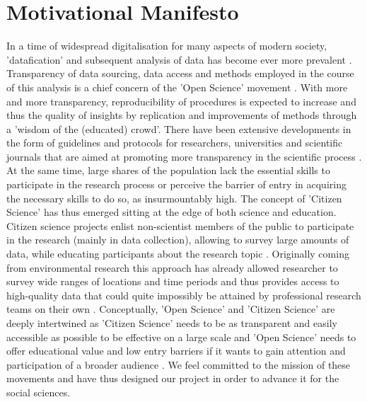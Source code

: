 \documentclass[preprint,12pt,authoryear]{elsarticle}
\begin{document}
	\section{Motivational Manifesto}
	In a time of widespread digitalisation for many aspects of modern society, 'datafication' and subsequent analysis of data has become ever more prevalent \citep{baack_datafication_2015, lycett_datafication:_2013}. Transparency of data sourcing, data access and methods employed in the course of this analysis is a chief concern of the 'Open Science' movement \citep{delfanti_open_2010}. With more and more transparency, reproducibility of procedures is expected to increase and thus the quality of insights by replication and improvements of methods through a 'wisdom of the (educated) crowd'. There have been extensive developments in the form of guidelines and protocols for researchers, universities and scientific journals that are aimed at promoting more transparency in the scientific process \citep{nosek_promoting_2015, miguel_promoting_2014}. 
	At the same time, large shares of the population lack the essential skills to participate in the research process or perceive the barrier of entry in acquiring the necessary skills to do so, as insurmountably high. The concept of 'Citizen Science' has thus emerged sitting at the edge of both science and education. Citizen science projects enlist non-scientist members of the public to participate in the research (mainly in data collection), allowing to survey large amounts of data, while educating participants about the research topic \citep{shirk_public_2012}. Originally coming from environmental research this approach has already allowed researcher to survey wide ranges of locations and time periods and thus provides access to high-quality data that could quite impossibly be attained by professional research teams on their own \citep{bonney_citizen_2009}.
	Conceptually, 'Open Science' and 'Citizen Science' are deeply intertwined as 'Citizen Science' needs to be as transparent and easily accessible as possible to be effective on a large scale \citep{nov_dusting_2011} and 'Open Science' needs to offer educational value and low entry barriers if it wants to gain attention and participation of a broader audience \citep{newman_future_2012}. We feel committed to the mission of these movements and have thus designed our project in order to advance it for the social sciences. 
\end{document}
